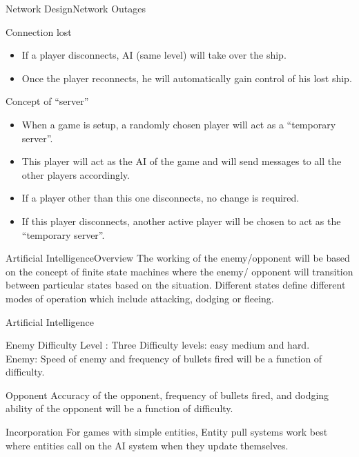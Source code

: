 \documentclass{beamer}
\begin{document}
\begin{frame}{Network Design}{Network Outages}
	\begin{block}{Connection lost}
		\begin{itemize}
			\item If a player disconnects, AI (same level) will take over the ship.
			\item Once the player reconnects, he will automatically gain control of his lost ship.
		\end{itemize}
	\end{block}	
	\begin{block}{Concept of ``server''}
		\begin{itemize}
			\item When a game is setup, a randomly chosen player will act as a ``temporary server''.
			\item This player will act as the AI of the game and will send messages to all the other players accordingly.
			\item If a player other than this one disconnects, no change is required.
			\item If this player disconnects, another active player will be chosen to act as the ``temporary server''.
		\end{itemize}
	\end{block}
\end{frame}

\begin{frame}{Artificial Intelligence}{Overview}
  The working of the enemy/opponent will be based on the concept of finite state machines where the enemy/ opponent will transition between particular states based on the situation. Different states define different modes of operation which include attacking, dodging or fleeing.
\end{frame}

\begin{frame}{Artificial Intelligence}{}
	\begin{block}{Enemy}
  			Difficulty Level : Three Difficulty levels: easy medium and hard. \\
			Enemy: Speed of enemy and frequency of bullets fired will be a function of difficulty.
 	\end{block}
	\begin{block}{Opponent} 
  			Accuracy of the opponent, frequency of bullets fired, and dodging ability of the opponent will be a function of difficulty.
	\end{block}
	\begin{block}{Incorporation}
		For games with simple entities, Entity pull systems work best where entities call on the AI system when they update themselves.
	\end{block}
\end{frame}
\end{document}
